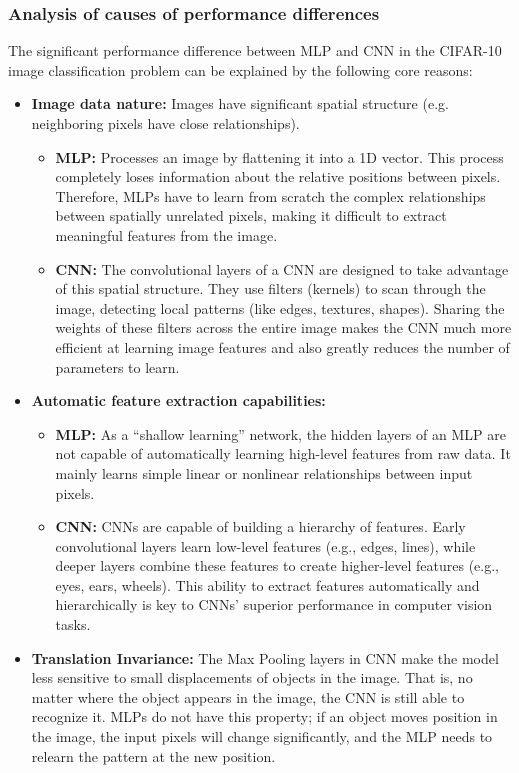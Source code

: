 \documentclass[12pt]{article}
\begin{document}
\subsubsection{Analysis of causes of performance differences}
The significant performance difference between MLP and CNN in the CIFAR-10 image classification problem can be explained by the following core reasons:
\begin{itemize}
    \item \textbf{Image data nature:} Images have significant spatial structure (e.g. neighboring pixels have close relationships).
    \begin{itemize}
        \item \textbf{MLP:} Processes an image by flattening it into a 1D vector. This process completely loses information about the relative positions between pixels. Therefore, MLPs have to learn from scratch the complex relationships between spatially unrelated pixels, making it difficult to extract meaningful features from the image.
        \item \textbf{CNN:} The convolutional layers of a CNN are designed to take advantage of this spatial structure. They use filters (kernels) to scan through the image, detecting local patterns (like edges, textures, shapes). Sharing the weights of these filters across the entire image makes the CNN much more efficient at learning image features and also greatly reduces the number of parameters to learn.
    \end{itemize}
    \item \textbf{Automatic feature extraction capabilities:}
    \begin{itemize}
        \item \textbf{MLP:} As a “shallow learning” network, the hidden layers of an MLP are not capable of automatically learning high-level features from raw data. It mainly learns simple linear or nonlinear relationships between input pixels.
        \item \textbf{CNN:} CNNs are capable of building a hierarchy of features. Early convolutional layers learn low-level features (e.g., edges, lines), while deeper layers combine these features to create higher-level features (e.g., eyes, ears, wheels). This ability to extract features automatically and hierarchically is key to CNNs' superior performance in computer vision tasks.
    \end{itemize}
    \item \textbf{Translation Invariance:} The Max Pooling layers in CNN make the model less sensitive to small displacements of objects in the image. That is, no matter where the object appears in the image, the CNN is still able to recognize it. MLPs do not have this property; if an object moves position in the image, the input pixels will change significantly, and the MLP needs to relearn the pattern at the new position.
    
\end{itemize}
\end{document}
